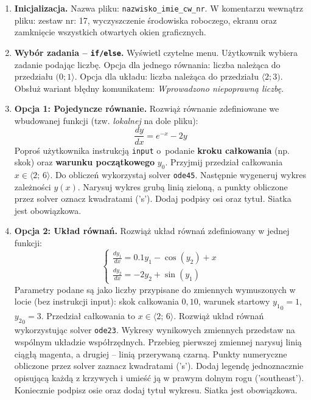 \documentclass[a4paper,11pt]{article}
\begin{document}
\begin{enumerate}[leftmargin=*, label=\textbf{\arabic*.}, itemsep=2pt]

  \item \textbf{Inicjalizacja.}
    Nazwa pliku: \texttt{nazwisko\_imie\_cw\_nr}. W komentarzu wewnątrz pliku: zestaw nr: 17, wyczyszczenie środowiska roboczego, ekranu oraz zamknięcie wszystkich otwartych okien graficznych.

  \item \textbf{Wybór zadania -- \texttt{if/else}.}
    Wyświetl czytelne menu. Użytkownik wybiera zadanie podając liczbę. Opcja dla jednego równania: liczba należąca do przedziału $(0; 1\rangle$. Opcja dla układu: liczba należąca do przedziału $\langle 2; 3)$. Obsłuż wariant błędny komunikatem: \textit{Wprowadzono niepoprawną liczbę}.

  \item \textbf{Opcja 1: Pojedyncze równanie.}
    Rozwiąż równanie zdefiniowane we wbudowanej funkcji (tzw. \textit{lokalnej} na dole pliku):
    \[ \frac{dy}{dx} = e^{-x} - 2y \]
    Poproś użytkownika instrukcją \texttt{input} o~podanie \textbf{kroku całkowania} (np. skok) oraz \textbf{warunku początkowego} $y_0$. Przyjmij przedział całkowania $x \in \langle 2;\,6 \rangle$.
    Do obliczeń wykorzystaj solver \texttt{ode45}. Następnie wygeneruj wykres zależności $y(x)$. Narysuj wykres grubą linią zieloną, a punkty obliczone przez solver oznacz kwadratami ('s'). Dodaj podpisy osi oraz tytuł. Siatka jest obowiązkowa.

  \item \textbf{Opcja 2: Układ równań.}
    Rozwiąż układ równań zdefiniowany w jednej funkcji:\\[-0.5em]
    \[
    \begin{cases}
      \frac{dy_1}{dx} = 0.1y_1 - \cos(y_2) + x \\
      \frac{dy_2}{dx} = -2y_2 + \sin(y_1)
    \end{cases}
    \]
    Parametry podane są jako liczby przypisane do zmiennych wymuszonych w locie (bez instrukcji input): skok całkowania $0{,}10$, warunek startowy $ {y_1}_{0} = 1 $, $ {y_2}_{0} = 3 $. Przedział całkowania to $x \in \langle 2;\,6 \rangle$.
    Rozwiąż układ równań wykorzystując solver \texttt{ode23}. Wykresy wynikowych zmiennych przedstaw na wspólnym układzie współrzędnych. Przebieg pierwszej zmiennej narysuj linią ciągłą magenta, a drugiej -- linią przerywaną czarną. Punkty numeryczne obliczone przez solver zaznacz kwadratami ('s'). Dodaj legendę jednoznacznie opisującą każdą z krzywych i umieść ją w prawym dolnym rogu ('southeast'). Koniecznie podpisz osie oraz dodaj tytuł wykresu. Siatka jest obowiązkowa.

\end{enumerate}
\end{document}
